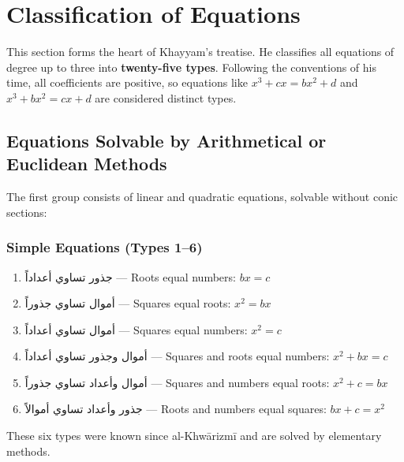 \clearpage

\section{Classification of Equations}

\label{sec:classification}


This section forms the heart of Khayyam's treatise.
He classifies all equations of degree up to three into 
\textbf{twenty-five types}.
Following the conventions of his time, all coefficients are positive, so equations like $x^3 + cx = b x^2 + d$ and $x^3 + b x^2 = cx + d$ are considered distinct types.

\subsection{Equations Solvable by Arithmetical or Euclidean Methods}

\label{subsec:simple}
The first group consists of linear and quadratic equations, solvable without conic sections:

\subsubsection{Simple Equations (Types 1--6)}

\label{subsubsec:simple-eqs}

\begin{enumerate}
[label=\arabic*.,noitemsep]
\item 
\textarabic{جذور تساوي أعداداً} --- Roots equal numbers: $bx = c$
\item 
\textarabic{أموال تساوي جذوراً} --- Squares equal roots: $x^2 = bx$
\item 
\textarabic{أموال تساوي أعداداً} --- Squares equal numbers: $x^2 = c$
\item 
\textarabic{أموال وجذور تساوي أعداداً} --- Squares and roots equal numbers: $x^2 + bx = c$
\item 
\textarabic{أموال وأعداد تساوي جذوراً} --- Squares and numbers equal roots: $x^2 + c = bx$
\item 
\textarabic{جذور وأعداد تساوي أموالاً} --- Roots and numbers equal squares: $bx + c = x^2$

\end{enumerate}
These six types were known since al-Khwārizmī and are solved by elementary methods.

